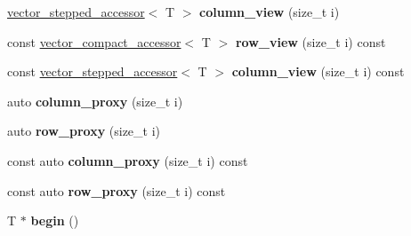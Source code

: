 \begin{DoxyCompactItemize}
\item 
\hyperlink{classmalgo_1_1vector__stepped__accessor}{vector\+\_\+stepped\+\_\+accessor}$<$ T $>$ {\bfseries column\+\_\+view} (size\+\_\+t i)\hypertarget{classmalgo_1_1matrix__compact__basic_a687053749183d90c77430b5df1e3e013}{}\label{classmalgo_1_1matrix__compact__basic_a687053749183d90c77430b5df1e3e013}

\item 
const \hyperlink{classmalgo_1_1vector__compact__accessor}{vector\+\_\+compact\+\_\+accessor}$<$ T $>$ {\bfseries row\+\_\+view} (size\+\_\+t i) const \hypertarget{classmalgo_1_1matrix__compact__basic_a510742f7c7210a16f76aaef1a6eb1395}{}\label{classmalgo_1_1matrix__compact__basic_a510742f7c7210a16f76aaef1a6eb1395}

\item 
const \hyperlink{classmalgo_1_1vector__stepped__accessor}{vector\+\_\+stepped\+\_\+accessor}$<$ T $>$ {\bfseries column\+\_\+view} (size\+\_\+t i) const \hypertarget{classmalgo_1_1matrix__compact__basic_ae16cddfd7861ea4b70102c84664fb95e}{}\label{classmalgo_1_1matrix__compact__basic_ae16cddfd7861ea4b70102c84664fb95e}

\item 
auto {\bfseries column\+\_\+proxy} (size\+\_\+t i)\hypertarget{classmalgo_1_1matrix__compact__basic_a1c27a068ec295d9bdc39221a2566633f}{}\label{classmalgo_1_1matrix__compact__basic_a1c27a068ec295d9bdc39221a2566633f}

\item 
auto {\bfseries row\+\_\+proxy} (size\+\_\+t i)\hypertarget{classmalgo_1_1matrix__compact__basic_a763bf2e0082862ed87694c3163b408fd}{}\label{classmalgo_1_1matrix__compact__basic_a763bf2e0082862ed87694c3163b408fd}

\item 
const auto {\bfseries column\+\_\+proxy} (size\+\_\+t i) const \hypertarget{classmalgo_1_1matrix__compact__basic_a3445735fd9b80f32f3901ef4ac52ab75}{}\label{classmalgo_1_1matrix__compact__basic_a3445735fd9b80f32f3901ef4ac52ab75}

\item 
const auto {\bfseries row\+\_\+proxy} (size\+\_\+t i) const \hypertarget{classmalgo_1_1matrix__compact__basic_ad610e9e7e9e33c6556be4e3840528474}{}\label{classmalgo_1_1matrix__compact__basic_ad610e9e7e9e33c6556be4e3840528474}

\item 
T $\ast$ {\bfseries begin} ()\hypertarget{classmalgo_1_1matrix__compact__basic_aa4b9c95989a68a1039475c967333d1e0}{}\label{classmalgo_1_1matrix__compact__basic_aa4b9c95989a68a1039475c967333d1e0}


\end{DoxyCompactItemize}
